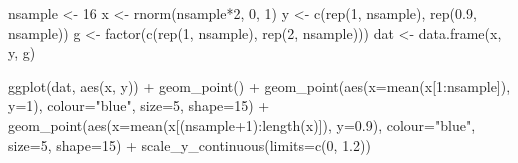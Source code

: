 \documentclass[
]{book}
\newenvironment{Shaded}{\begin{snugshade}}{\end{snugshade}}
\newcommand{\AttributeTok}[1]{\textcolor[rgb]{0.77,0.63,0.00}{#1}}
\newcommand{\DecValTok}[1]{\textcolor[rgb]{0.00,0.00,0.81}{#1}}
\newcommand{\FloatTok}[1]{\textcolor[rgb]{0.00,0.00,0.81}{#1}}
\newcommand{\FunctionTok}[1]{\textcolor[rgb]{0.00,0.00,0.00}{#1}}
\newcommand{\NormalTok}[1]{#1}
\newcommand{\OtherTok}[1]{\textcolor[rgb]{0.56,0.35,0.01}{#1}}
\newcommand{\SpecialCharTok}[1]{\textcolor[rgb]{0.00,0.00,0.00}{#1}}
\newcommand{\StringTok}[1]{\textcolor[rgb]{0.31,0.60,0.02}{#1}}
\begin{document}
\begin{Shaded}
\begin{Highlighting}[]
\NormalTok{nsample }\OtherTok{\textless{}{-}} \DecValTok{16}
\NormalTok{x }\OtherTok{\textless{}{-}} \FunctionTok{rnorm}\NormalTok{(nsample}\SpecialCharTok{*}\DecValTok{2}\NormalTok{, }\DecValTok{0}\NormalTok{, }\DecValTok{1}\NormalTok{)}
\NormalTok{y }\OtherTok{\textless{}{-}} \FunctionTok{c}\NormalTok{(}\FunctionTok{rep}\NormalTok{(}\DecValTok{1}\NormalTok{, nsample), }\FunctionTok{rep}\NormalTok{(}\FloatTok{0.9}\NormalTok{, nsample))}
\NormalTok{g }\OtherTok{\textless{}{-}} \FunctionTok{factor}\NormalTok{(}\FunctionTok{c}\NormalTok{(}\FunctionTok{rep}\NormalTok{(}\DecValTok{1}\NormalTok{, nsample), }\FunctionTok{rep}\NormalTok{(}\DecValTok{2}\NormalTok{, nsample)))}
\NormalTok{dat }\OtherTok{\textless{}{-}} \FunctionTok{data.frame}\NormalTok{(x, y, g)}

\FunctionTok{ggplot}\NormalTok{(dat, }\FunctionTok{aes}\NormalTok{(x, y)) }\SpecialCharTok{+}
  \FunctionTok{geom\_point}\NormalTok{() }\SpecialCharTok{+}
  \FunctionTok{geom\_point}\NormalTok{(}\FunctionTok{aes}\NormalTok{(}\AttributeTok{x=}\FunctionTok{mean}\NormalTok{(x[}\DecValTok{1}\SpecialCharTok{:}\NormalTok{nsample]), }\AttributeTok{y=}\DecValTok{1}\NormalTok{), }\AttributeTok{colour=}\StringTok{"blue"}\NormalTok{, }\AttributeTok{size=}\DecValTok{5}\NormalTok{, }\AttributeTok{shape=}\DecValTok{15}\NormalTok{) }\SpecialCharTok{+}
  \FunctionTok{geom\_point}\NormalTok{(}\FunctionTok{aes}\NormalTok{(}\AttributeTok{x=}\FunctionTok{mean}\NormalTok{(x[(nsample}\SpecialCharTok{+}\DecValTok{1}\NormalTok{)}\SpecialCharTok{:}\FunctionTok{length}\NormalTok{(x)]), }\AttributeTok{y=}\FloatTok{0.9}\NormalTok{), }\AttributeTok{colour=}\StringTok{"blue"}\NormalTok{, }\AttributeTok{size=}\DecValTok{5}\NormalTok{, }\AttributeTok{shape=}\DecValTok{15}\NormalTok{) }\SpecialCharTok{+}
  \FunctionTok{scale\_y\_continuous}\NormalTok{(}\AttributeTok{limits=}\FunctionTok{c}\NormalTok{(}\DecValTok{0}\NormalTok{, }\FloatTok{1.2}\NormalTok{))}
\end{Highlighting}
\end{Shaded}
\end{document}
